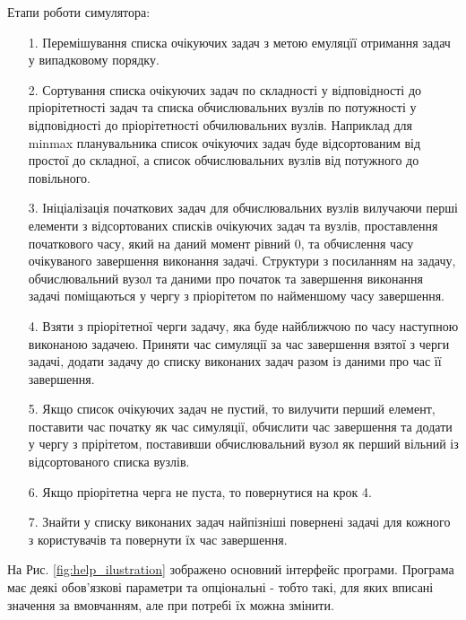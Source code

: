Етапи роботи симулятора:
\begin{itemize}
	\item[1.] Перемішування списка очікуючих задач з метою емуляцїї отримання задач у випадковому порядку.
	
	\item[2.] Сортування списка очікуючих задач по складності у відповідності до пріорітетності задач та списка обчислювальних вузлів по потужності у відповідності до пріорітетності обчилювальних вузлів. Наприклад для minmax планувальника список очікуючих задач буде відсортованим від простої до складної, а список обчислювальних вузлів від потужного до повільного.
	
	\item[3.] Ініціалізація початкових задач для обчислювальних вузлів вилучаючи перші елементи з  відсортованих списків очікуючих задач та вузлів, проставлення початкового часу, який на даний момент рівний 0, та обчислення часу очікуваного завершення виконання задачі. Структури з посиланням на задачу, обчислювальний вузол та даними про початок та завершення виконання задачі поміщаються у чергу з пріорітетом по найменшому часу завершення.
	
	\item[4.] Взяти з пріорітетної черги задачу, яка буде найближчою по часу наступною виконаною задачею. Приняти час симуляції за час завершення взятої з черги задачі, додати задачу до списку виконаних задач разом із даними про час її завершення.
	
	\item[5.] Якщо список очікуючих задач не пустий, то вилучити перший елемент, поставити час початку як час симуляції, обчислити час завершення та додати у чергу з прірітетом, поставивши обчислювальний вузол як перший вільний із відсортованого списка вузлів.
	
	\item[6.] Якщо пріорітетна черга не пуста, то повернутися на крок 4.
	
	\item[7.] Знайти у списку виконаних задач найпізніші повернені задачі для кожного з користувачів та повернути їх час завершення.
\end{itemize}

На Рис. \ref{fig:help_ilustration} зображено основний інтерфейс програми. Програма має деякі обов'язкові параметри та опціональні - тобто такі, для яких вписані значення за вмовчанням, але при потребі їх можна змінити.

